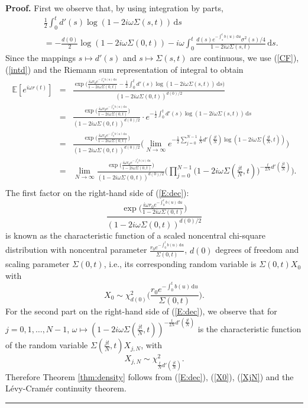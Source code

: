 \documentclass[6pt]{article}
\def\ud{\, \mathrm{d}}
\newenvironment{proof}[1][Proof]{\noindent\textbf{#1.} }{\ \rule{0.5em}{0.5em}}
\numberwithin{equation}{section}
\begin{document}
\begin{proof}
First we observe that, by using integration by parts,
\begin{eqnarray}
\label{intd}
&&\frac{1}{2}\int_0^td'(s)\log\left(1-2i\omega\Sigma(s,t)\right)\ud s\nonumber\\
&&=-\frac{d(0)}{2}\log\left(1-2i\omega\Sigma(0,t)\right)-i\omega\int_0^t\frac{d(s)e^{-\int_s^tb(u)\ud u}\sigma^2(s)/4}{1-2i\omega\Sigma(s,t)}\ud s.
\end{eqnarray}
Since the mappings $s\mapsto d'(s)$ and $s\mapsto\Sigma(s,t)$ are continuous, we use (\ref{CF}), (\ref{intd}) and the Riemann sum representation of integral to obtain
\begin{eqnarray}
\label{E:dec}
\mathbb E[e^{i\omega r(t)}]&=&\frac{\exp\big(\frac{i\omega r_0e^{-\int_0^tb(u)\ud u}}{1-2i\omega \Sigma(0,t)}-\frac{1}{2}\int_0^td'(s)\log\left(1-2i\omega\Sigma(s,t)\right)\ud s\big)}{(1-2i\omega \Sigma(0,t))^{d(0)/2}}\nonumber\\
&=&\frac{\exp\big(\frac{i\omega r_0e^{-\int_0^tb(u)\ud u}}{1-2i\omega \Sigma(0,t)}\big)}{(1-2i\omega \Sigma(0,t))^{d(0)/2}}\cdot e^{-\frac{1}{2}\int_0^td'(s)\log\left(1-2i\omega\Sigma(s,t)\right)\ud s}\nonumber\\
&=&\frac{\exp\big(\frac{i\omega r_0e^{-\int_0^tb(u)\ud u}}{1-2i\omega \Sigma(0,t)}\big)}{(1-2i\omega \Sigma(0,t))^{d(0)/2}}\Big(\lim_{N\rightarrow\infty}e^{-\frac{1}{2}\sum_{j=0}^{N-1}\frac{t}{N}d'(\frac{jt}{N})\log(1-2i\omega\Sigma(\frac{jt}{N},t))}\Big)\nonumber\\
&=&\lim_{N\rightarrow\infty}\frac{\exp\big(\frac{i\omega r_0e^{-\int_0^tb(u)\ud u}}{1-2i\omega \Sigma(0,t)}\big)}{(1-2i\omega \Sigma(0,t))^{d(0)/2}}\Big(\prod_{j=0}^{N-1}\Big(1-2i\omega\Sigma(\frac{jt}{N},t)\Big)^{-\frac{t}{2N}d'(\frac{jt}{N})}\Big).\nonumber\\
\end{eqnarray}
The first factor on the right-hand side of (\ref{E:dec}):
$$
\frac{\exp\big(\frac{i\omega r_0e^{-\int_0^tb(u)\ud u}}{1-2i\omega \Sigma(0,t)}\big)}{(1-2i\omega \Sigma(0,t))^{d(0)/2}}
$$
is known as the characteristic function of a scaled noncentral chi-square distribution with noncentral parameter $\frac{r_0e^{-\int_0^tb(u)\ud u}}{\Sigma(0,t)}$, $d(0)$ degrees of freedom and scaling parameter $\Sigma(0,t)$, i.e., its corresponding random variable is $\Sigma(0,t)X_0$ with
\begin{equation}
\label{X0}
X_0\sim\chi_{d(0)}^2\Big(\frac{r_0e^{-\int_0^tb(u)\ud u}}{\Sigma(0,t)}\Big).
\end{equation}
For the second part on the right-hand side of (\ref{E:dec}), we observe that for $j=0,1,\ldots,N-1$, $\omega\mapsto(1-2i\omega\Sigma(\frac{jt}{N},t))^{-\frac{t}{2N}d'(\frac{jt}{N})}$ is the characteristic function of the random variable $\Sigma(\frac{jt}{N},t)X_{j,N}$, with
\begin{equation}
\label{XjN}
X_{j,N}\sim \chi^2_{\frac{t}{N}d'(\frac{jt}{N})}.
\end{equation} Therefore Theorem \ref{thm:density} follows from (\ref{E:dec}), (\ref{X0}), (\ref{XjN}) and the L\'evy-Cram\'er continuity theorem.
\end{proof}
\end{document}
